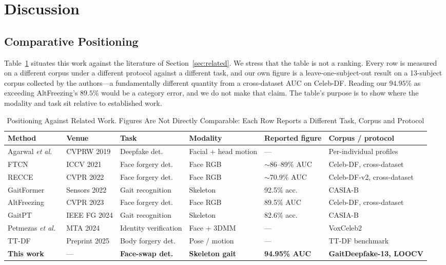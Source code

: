 \documentclass[journal]{IEEEtran}
\newcommand{\tabhead}[1]{\textbf{#1}}
\begin{document}
\section{Discussion}
\label{sec:discussion}

\subsection{Comparative Positioning}

Table~\ref{tab:comparison} situates this work against the literature of
Section~\ref{sec:related}. We stress that the table is not a ranking. Every row
is measured on a different corpus under a different protocol against a
different task, and our own figure is a leave-one-subject-out result on a
13-subject corpus collected by the authors---a fundamentally different
quantity from a cross-dataset AUC on Celeb-DF. Reading our $94.95\%$ as
exceeding AltFreezing's $89.5\%$ would be a category error, and we do not make
that claim. The table's purpose is to show where the modality and task sit
relative to established work.

\begin{table}[!t]
\caption{Positioning Against Related Work. Figures Are Not Directly
Comparable: Each Row Reports a Different Task, Corpus and Protocol}
\label{tab:comparison}
\centering
\small
\begin{tabular}{@{}llllll@{}}
\toprule
\tabhead{Method} & \tabhead{Venue} & \tabhead{Task} & \tabhead{Modality} &
\tabhead{Reported figure} & \tabhead{Corpus / protocol} \\
\midrule
Agarwal \emph{et al.}~\cite{agarwal2019} & CVPRW 2019 & Deepfake det.
  & Facial + head motion & --- & Per-individual profiles \\
FTCN~\cite{ftcn} & ICCV 2021 & Face forgery det.
  & Face RGB & $\sim$86--89\% AUC & Celeb-DF, cross-dataset \\
RECCE~\cite{recce} & CVPR 2022 & Face forgery det.
  & Face RGB & $\sim$70.9\% AUC & Celeb-DF-v2, cross-dataset \\
GaitFormer~\cite{gaitformer} & Sensors 2022 & Gait recognition
  & Skeleton & 92.5\% acc. & CASIA-B \\
AltFreezing~\cite{altfreezing} & CVPR 2023 & Face forgery det.
  & Face RGB & 89.5\% AUC & Celeb-DF, cross-dataset \\
GaitPT~\cite{gaitpt} & IEEE FG 2024 & Gait recognition
  & Skeleton & 82.6\% acc. & CASIA-B \\
Petmezas \emph{et al.}~\cite{hybrid_face} & MTA 2024 & Identity verification
  & Face + 3DMM & --- & VoxCeleb2 \\
TT-DF~\cite{ttdf} & Preprint 2025 & Body forgery det.
  & Pose / motion & --- & TT-DF benchmark \\
\midrule
\textbf{This work} & --- & \textbf{Face-swap det.}
  & \textbf{Skeleton gait} & \textbf{94.95\% AUC}
  & \textbf{GaitDeepfake-13, LOOCV} \\
\bottomrule
\end{tabular}
\end{table}
\end{document}
